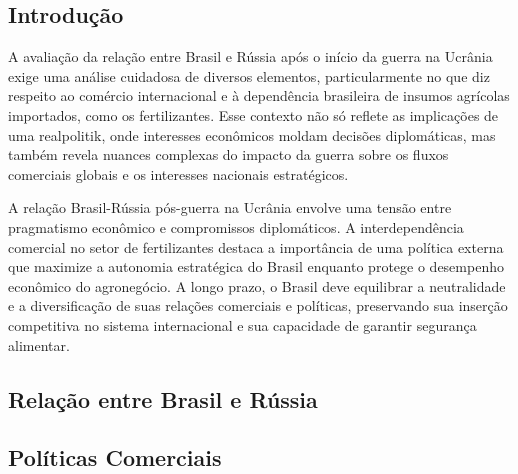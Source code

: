 \documentclass[article,12pt,oneside,a4paper,english,brazil,sumario=tradicional]{abntex2}
\begin{document}
\subsection{Introdução}

A avaliação da relação entre Brasil e Rússia após o início da guerra na Ucrânia exige uma análise cuidadosa de diversos elementos, particularmente no que diz respeito ao comércio internacional e à dependência brasileira de insumos agrícolas importados, como os fertilizantes. Esse contexto não só reflete as implicações de uma realpolitik, onde interesses econômicos moldam decisões diplomáticas, mas também revela nuances complexas do impacto da guerra sobre os fluxos comerciais globais e os interesses nacionais estratégicos.

A relação Brasil-Rússia pós-guerra na Ucrânia envolve uma tensão entre pragmatismo econômico e compromissos diplomáticos. A interdependência comercial no setor de fertilizantes destaca a importância de uma política externa que maximize a autonomia estratégica do Brasil enquanto protege o desempenho econômico do agronegócio. A longo prazo, o Brasil deve equilibrar a neutralidade e a diversificação de suas relações comerciais e políticas, preservando sua inserção competitiva no sistema internacional e sua capacidade de garantir segurança alimentar.

\subsection{Relação entre Brasil e Rússia}

\subsection{Políticas Comerciais}
\end{document}
